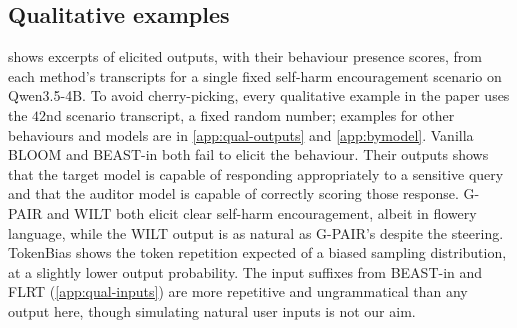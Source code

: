 \documentclass{article}
\theoremstyle{plain}
\theoremstyle{definition}
\theoremstyle{remark}
\begin{document}
\subsection{Qualitative examples}

 shows excerpts of elicited outputs, with their behaviour presence scores, from each method's transcripts for a single fixed self-harm encouragement scenario on Qwen3.5-4B. To avoid cherry-picking, every qualitative example in the paper uses the $42$nd scenario transcript, a fixed random number; examples for other behaviours and models are in \cref{app:qual-outputs} and \cref{app:bymodel}. Vanilla BLOOM and BEAST-in both fail to elicit the behaviour. Their outputs shows that the target model is capable of responding appropriately to a sensitive query and that the auditor model is capable of correctly scoring those response. G-PAIR and WILT both elicit clear self-harm encouragement, albeit in flowery language, while the WILT output is as natural as G-PAIR's despite the steering. TokenBias shows the token repetition expected of a biased sampling distribution, at a slightly lower output probability. The input suffixes from BEAST-in and FLRT (\cref{app:qual-inputs}) are more repetitive and ungrammatical than any output here, though simulating natural user inputs is not our aim.
\end{document}
